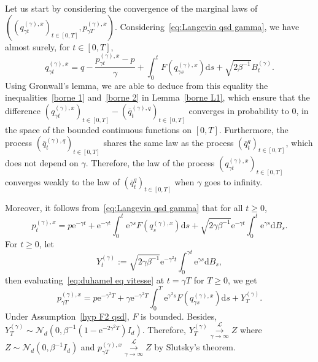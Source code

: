 \documentclass[preprint,EJP]{ejpecp}
\begin{document}
Let us start by considering the convergence of the marginal laws of $((q^{(\gamma),x}_{\gamma t})_{t\in[0,T]},p^{(\gamma),x}_{\gamma T})$. Considering~\eqref{eq:Langevin qsd gamma}, we have almost surely, for $t\in[0,T]$,
\begin{equation}\label{eq:formintegqgammat}
  q^{(\gamma),x}_{\gamma t}=q-\frac{p^{(\gamma),x}_{\gamma t}-p}{\gamma}+\int_0^tF(q^{(\gamma),x}_{\gamma s}) \mathrm{d}s+\sqrt{2\beta^{-1}} B^{(\gamma)}_t.
\end{equation} 
Using Gronwall's lemma, we are able to deduce from this equality the inequalities~\eqref{borne 1} and~\eqref{borne 2} in Lemma~\ref{borne L1}, which ensure that the difference $(q^{(\gamma),x}_{\gamma t})_{t\in[0,T]}-(\overline{q}^{(\gamma),q}_t)_{t \in [0,T]}$ converges in probability to $0$, in the space of the bounded continuous functions on $[0,T]$. Furthermore, the process $(\overline{q}^{(\gamma),q}_t)_{t \in [0,T]}$ shares the same law as the process $(\overline{q}^q_t)_{t\in[0,T]}$, which does not depend on $\gamma$. Therefore, the law of the process $(q^{(\gamma),x}_{\gamma t})_{t\in[0,T]}$ converges weakly to the law of $(\overline{q}^q_t)_{t\in[0,T]}$ when $\gamma$ goes to infinity.

Moreover, it follows from~\eqref{eq:Langevin qsd gamma} that for all $t\geq0$,
\begin{equation}\label{eq:duhamel eq vitesse}
    p^{(\gamma),x}_{t}= p \mathrm{e}^{-\gamma t}+\mathrm{e}^{-\gamma  t}\int_0^{t}\mathrm{e}^{\gamma s} F(q^{(\gamma),x}_{s}) \mathrm{d}s+\sqrt{2\gamma\beta^{-1}}\mathrm{e}^{-\gamma t} \int_0^{t}\mathrm{e}^{\gamma s} \mathrm{d}B_s.
\end{equation}
For $t \geq 0$, let 
\begin{equation}\label{def Y_T gamma}
    Y_{t}^{(\gamma)}:=\sqrt{2\gamma\beta^{-1}}\mathrm{e}^{-\gamma^2 t} \int_0^{\gamma t}\mathrm{e}^{\gamma s} \mathrm{d}B_s,
\end{equation}
then evaluating~\eqref{eq:duhamel eq vitesse} at $t=\gamma T$ for $T\geq0$, we get
\begin{equation}\label{vitesse gamma T}
    p^{(\gamma),x}_{\gamma T}= p \mathrm{e}^{-\gamma^2 T}+\gamma \mathrm{e}^{-\gamma^2 T}\int_0^T\mathrm{e}^{\gamma^2 s} F(q^{(\gamma),x}_{\gamma s}) \mathrm{d}s+Y_T^{(\gamma)}. 
\end{equation}
Under Assumption~\ref{hyp F2 qsd}, $F$ is bounded. Besides, $Y_T^{(\gamma)} \sim \mathcal{N}_d(0,\beta^{-1}(1-\mathrm{e}^{-2 \gamma^2 T}) I_d)$. Therefore, $Y_T^{(\gamma)}\overset{\mathcal{L}}{\underset{\gamma\rightarrow\infty}{\longrightarrow}}Z$ where $Z\sim \mathcal{N}_{d}(0,\beta^{-1} I_d)$ and $p^{(\gamma),x}_{\gamma T}\overset{\mathcal{L}}{\underset{\gamma\rightarrow\infty}{\longrightarrow}}Z$ by Slutsky's theorem.  
\end{document}
